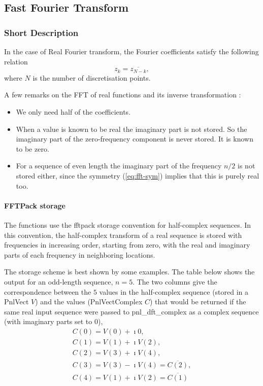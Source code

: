 \subsection{Fast Fourier Transform}
\subsubsection{Short Description}

In the case of Real Fourier transform, the Fourier coefficients satisfy the
following relation
\begin{equation}
  \label{eq:fft-sym}
  z_k = \overline{z_{N-k}}, 
\end{equation}
where $N$ is the number of discretisation points.

A few remarks on the FFT of real functions and its inverse transformation :
\begin{itemize}
\item We only need half of the coefficients.
\item When a value is known to be real the imaginary part is not stored.
So the imaginary part of the zero-frequency component is never stored. It is
known to be zero.
\item For a sequence of even length the imaginary part of the frequency
  $n/2$ is not stored either, since the symmetry (\ref{eq:fft-sym}) implies
  that this is purely real too.
\end{itemize}


\paragraph{FFTPack storage}
\label{sec:fftpack-storage}

The functions use the fftpack storage convention for half-complex sequences.
In this convention, the half-complex transform of a real sequence is stored
with frequencies in increasing order, starting from zero, with the real and
imaginary parts of each frequency in neighboring locations.

The storage scheme is best shown by some examples. The table below shows the
output for an odd-length sequence, $n=5$.  The two columns give the
correspondence between the $5$ values in the half-complex sequence (stored in
a PnlVect $V$) and the values (PnlVectComplex $C$) that would be returned if
the same real input sequence were passed to pnl_dft_complex as a complex
sequence (with imaginary parts set to 0), 
\begin{equation}
  \begin{array}{l}
         C(0) =  V(0) + \imath 0, \\ 
         C(1) =  V(1) + \imath V(2), \\
         C(2) =  V(3) + \imath V(4), \\
         C(3) = V(3) - \imath V(4)=  \overline{C(2)} , \\
         C(4) = V(1) + \imath V(2)=  \overline{C(1)} 
  \end{array}   
\end{equation}

